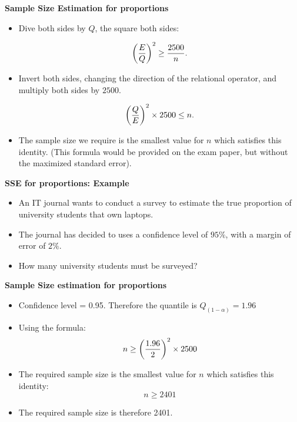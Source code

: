 \documentclass[]{report}
\begin{document}

\textbf{Sample Size Estimation for proportions}

\begin{itemize}

\item  Dive both sides by $Q$, the square both sides:

\[ \left({E\over Q}\right)^2 \geq {2500 \over n}. \]

\item  Invert both sides, changing the direction of the relational operator, and multiply both sides by $2500$.

\[ \left({Q\over E}\right)^2 \times 2500 \leq n. \]

\item  The sample size we require is the smallest value for $n$ which satisfies this identity. (This formula would be provided on the exam paper, but without the maximized standard error).
\end{itemize}


\textbf{SSE for proportions: Example}
\begin{itemize}
\item  An IT journal wants to conduct a survey to estimate the true proportion of university students that own laptops.
\item  The journal has decided to uses a confidence level of $95\%$, with a margin of error of $2\%$.
\item  How many university students must be surveyed?
\end{itemize}



\textbf{Sample Size estimation for proportions}

\begin{itemize}
\item  Confidence level = 0.95. Therefore the quantile is $Q_{(1-\alpha)} = 1.96$
\item  Using the formula: \[ n \geq \left({1.96 \over 2 }\right)^2 \times 2500  \]
\item  The required sample size is the smallest value for $n$ which satisfies this identity: \[ n \geq 2401  \]
\item  The required sample size is therefore 2401.
\end{itemize}
\end{document}
